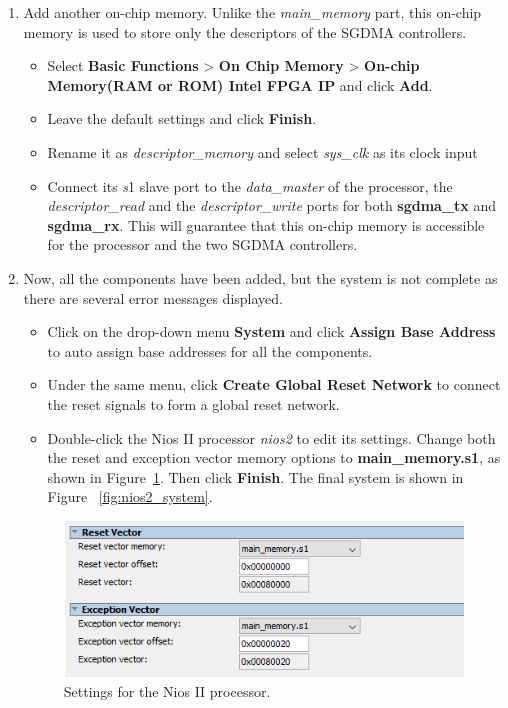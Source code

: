 \documentclass[11pt, twoside, pdftex]{article}
\begin{document}
\begin{enumerate}
	\item Add another on-chip memory. Unlike the {\it main\_memory} part, this on-chip memory is used to store only the descriptors of the SGDMA controllers.
		\begin{itemize}
			\item Select {\bf Basic Functions} > {\bf On Chip Memory} > {\bf On-chip Memory(RAM or ROM) Intel FPGA IP} and click {\bf Add}.
			\item Leave the default settings and click {\bf Finish}. 
			\item Rename it as {\it descriptor\_memory} and select {\it sys\_clk} as its clock input
			\item Connect its {\it s}1 slave port to the {\it data\_master} of the processor, the {\it descriptor\_read} and the {\it descriptor\_write} ports for both {\bf sgdma\_tx} and {\bf sgdma\_rx}. This will guarantee that this on-chip memory is accessible for the processor and the two SGDMA controllers. 
		\end{itemize}
	
	\item Now, all the components have been added, but the system is not complete as there are several error messages displayed. 
		\begin{itemize}
			\item Click on the drop-down menu {\bf System} and click {\bf Assign Base Address} to auto assign base addresses for all the components.
			\item Under the same menu, click {\bf Create Global Reset Network} to connect the reset signals to form a global reset network.
			\item Double-click the Nios II processor {\it nios2} to edit its settings.  Change both the reset and exception vector memory options to {\bf main\_memory.s1}, as shown in Figure~\ref{fig:nios2_settings}. Then click {\bf Finish}. The final system is shown in Figure ~\ref{fig:nios2_system}.
		\end{itemize}

		\begin{figure}[H]
			\centering
			  \includegraphics[scale=0.55]{figures/nios2_settings.png}
			\caption{Settings for the Nios II processor.} 
			\label{fig:nios2_settings}
		\end{figure}
	

\end{enumerate}
\end{document}
